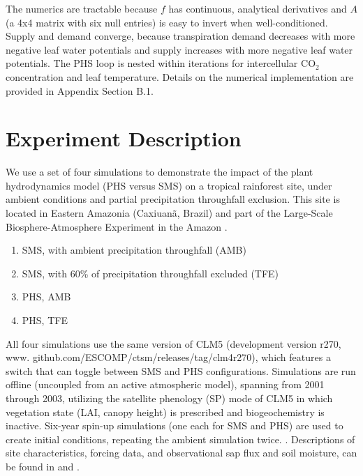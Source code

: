 \documentclass[draft,linenumbers]{agujournal}
\begin{document}
    The numerics are tractable because $f$ has continuous, analytical derivatives and $A$ (a 4x4 matrix with six null entries) is easy to invert when well-conditioned. Supply and demand converge, because transpiration demand decreases with more negative leaf water potentials and supply increases with more negative leaf water potentials. The PHS loop is nested within iterations for intercellular CO$_2$ concentration and leaf temperature. Details on the numerical implementation are provided in Appendix Section B.1.

 
\section{Experiment Description}
\label{sect:exp}

We use a set of four simulations to demonstrate the impact of the plant hydrodynamics model (PHS versus SMS) on a tropical rainforest site, under ambient conditions and partial precipitation throughfall exclusion.
This site is located in Eastern Amazonia (Caxiuan\~a, Brazil) and part of the Large-Scale Biosphere-Atmosphere Experiment in the Amazon \citep{avissar2002}.

\begin{enumerate}
\item SMS, with ambient precipitation throughfall (AMB)
\item SMS, with 60\% of precipitation throughfall excluded (TFE)
\item PHS, AMB
\item PHS, TFE
\end{enumerate}

All four simulations use the same version of CLM5
(development version r270, www. github.com/ESCOMP/ctsm/releases/tag/clm4\textunderscore r270),
which features a switch that can toggle between SMS and PHS configurations.
Simulations are run offline (uncoupled from an active atmospheric model), spanning from 2001 through 2003, utilizing the satellite phenology (SP) mode of CLM5 in which vegetation state (LAI, canopy height) is prescribed and biogeochemistry is inactive. Six-year spin-up simulations (one each for SMS and PHS) are used to create initial conditions, repeating the ambient simulation twice. . Descriptions of site characteristics, forcing data, and observational sap flux and soil moisture, can be found in \cite{fisher2007} and \cite{fisher2008}.
\end{document}

